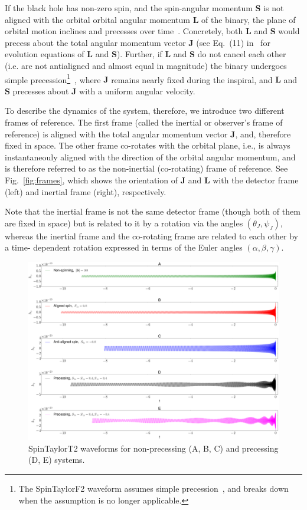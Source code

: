 If the black hole has non-zero spin, and the spin-angular momentum
$\mathbf{S}$ is  not aligned with the orbital orbital angular momentum
$\mathbf{L}$ of the binary, the plane of orbital motion inclines and precesses
over time~\cite{Apostolatos1994}. Concretely, both $\mathbf{L}$ and
$\mathbf{S}$  would precess about the total angular momentum vector
$\mathbf{J}$ (see Eq.~(11) in~\cite{Apostolatos1994} for evolution equations
of $\mathbf{L}$ and $\mathbf{S}$). Further, if $\mathbf{L}$ and $\mathbf{S}$
do not cancel each other (i.e. are not antialigned and almost equal in
magnitude)  the binary undergoes simple precession\footnote{The SpinTaylorF2
waveform assumes simple precession~\cite{Lundgren2014}, and breaks down  when
the assumption is no longer applicable.}~\cite{Apostolatos1994}, where
$\mathbf{J}$ remains nearly fixed during the inspiral, and $\mathbf{L}$ and
$\mathbf{S}$ precesses about $\mathbf{J}$ with a uniform angular velocity.

To describe the dynamics of the system, therefore, we introduce two different
frames of reference. The first frame (called the inertial or observer's frame
of reference) is aligned with the total angular momentum vector $\mathbf{J}$,
and, therefore fixed in space. The other frame co-rotates with the orbital
plane, i.e., is always instantaneouly aligned with the direction of the
orbital angular momentum, and is therefore referred to as the non-inertial
(co-rotating) frame of reference. See Fig.~\ref{fig:frames}, which shows the
orientation of $\mathbf{J}$ and $\mathbf{L}$ with the detector frame (left)
and inertial frame (right), respectively. 

Note that the inertial frame is not the same detector frame (though both of
them are fixed in space) but is related to it by a rotation via the angles
$(\theta_J,\psi_J)$, whereas the inertial frame and the co-rotating frame are
related to each other by a time- dependent rotation expressed in terms of the
Euler angles $(\alpha, \beta,
\gamma)$.

\label{fig:waveforms} 
\begin{figure}[t]
\includegraphics[width=\textwidth]{./images/SPT2_waveforms.pdf}
\caption{SpinTaylorT2 waveforms for non-precessing (A, B, C) and precessing
(D, E) systems.}
\centering 
\end{figure}


